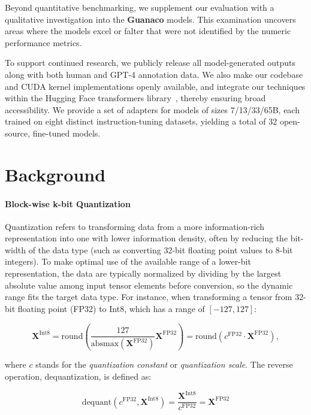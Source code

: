 Beyond quantitative benchmarking, we supplement our evaluation with a qualitative investigation into the \textbf{Guanaco} models. This examination uncovers areas where the models excel or falter that were not identified by the numeric performance metrics.

To support continued research, we publicly release all model-generated outputs along with both human and GPT-4 annotation data. We also make our codebase and CUDA kernel implementations openly available, and integrate our techniques within the Hugging Face transformers library~\citep{wolf2019huggingface}, thereby ensuring broad accessibility. We provide a set of adapters for models of sizes 7/13/33/65B, each trained on eight distinct instruction-tuning datasets, yielding a total of 32 open-source, fine-tuned models.

\section{Background}
\paragraph{Block-wise k-bit Quantization} Quantization refers to transforming data from a more information-rich representation into one with lower information density, often by reducing the bit-width of the data type (such as converting 32-bit floating point values to 8-bit integers). To make optimal use of the available range of a lower-bit representation, the data are typically normalized by dividing by the largest absolute value among input tensor elements before conversion, so the dynamic range fits the target data type. For instance, when transforming a tensor from 32-bit floating point (FP32) to Int8, which has a range of $[-127, 127]$:

\begin{equation}
    \mathbf{X}^{ \text{Int8}} = \text{round}\left( \frac{127}{{\text{absmax}}(\mathbf{X}^{{\text{FP32}}})}\mathbf{X}^{{\text{FP32}}} \right) = \text{round}(c^{\text{FP32}}\cdot \mathbf{X}^{{\text{FP32}}}),
\end{equation}

where $c$ stands for the {\em quantization constant} or {\em quantization scale}. The reverse operation, dequantization, is defined as:

\begin{equation}
    \text{dequant}(c^{\text{FP32}}, \mathbf{X}^{\text{Int8}}) = \frac{\mathbf{X}^{\text{Int8}}}{c^{\text{FP32}}} = \mathbf{X}^{\text{FP32}}
\end{equation}

